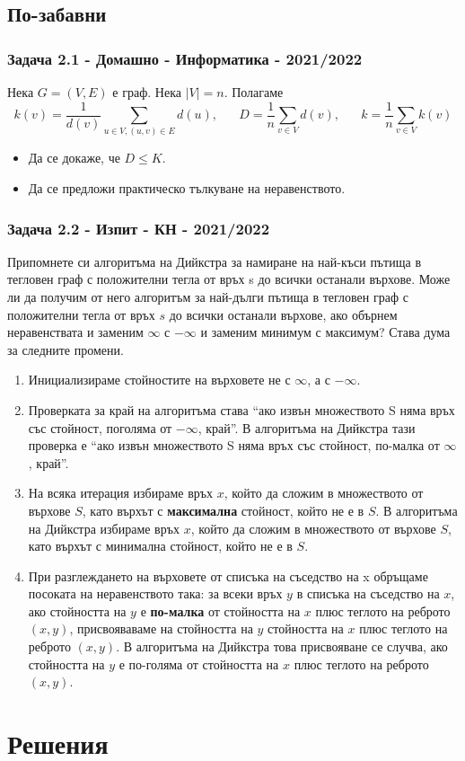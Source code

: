 \documentclass[12pt]{article}
\begin{document}
\subsection*{По-забавни}
\subsubsection*{Задача 2.1 - Домашно - Информатика - 2021/2022}
Нека $G = (V, E)$ е граф. Нека $|V| = n$. Полагаме
\begin{equation*}
    k(v) = \frac{1}{d(v)} \displaystyle\sum_{u \in V, (u, v) \in E} d(u), \; \; \; \; \; \; D = \frac{1}{n}\displaystyle\sum_{v \in V} d(v), \; \; \; \; \; \; k = \frac{1}{n}\displaystyle\sum_{v \in V} k(v) 
\end{equation*}
\begin{itemize}
    \item Да се докаже, че $D \leq K$.
    \item Да се предложи практическо тълкуване на неравенството.
\end{itemize}

\subsubsection*{Задача 2.2 - Изпит - КН - 2021/2022}
Припомнете си алгоритъма на Дийкстра за намиране на най-къси пътища в тегловен граф с положителни тегла от връх s до всички останали върхове. Може ли да получим от него алгоритъм за най-дълги пътища в тегловен граф с положителни тегла от връх $s$ до всички останали върхове, ако обърнем неравенствата и заменим $\infty$ с $-\infty$ и заменим минимум с максимум? Става дума за следните промени.
\begin{enumerate}
    \item Инициализираме стойностите на върховете не с $\infty$, а с $-\infty$.
    \item Проверката за край на алгоритъма става ``ако извън множеството S няма връх със стойност, поголяма от $-\infty$, край''. В алгоритъма на Дийкстра тази проверка е ``ако извън множеството S няма връх със стойност, по-малка от $\infty$, край''.
    \item На всяка итерация избираме връх $x$, който да сложим в множеството от върхове $S$, като върхът с \textbf{максимална} стойност, който не е в $S$. В алгоритъма на Дийкстра избираме връх $x$, който да сложим в множеството от върхове $S$, като върхът с минимална стойност, който не е в $S$.
    \item При разглеждането на върховете от списъка на съседство на x обръщаме посоката на неравенството така: за всеки връх $y$ в списъка на съседство на $x$, ако стойността на $y$ е \textbf{по-малка} от стойността на $x$ плюс теглото на реброто $(x, y)$, присвояваваме на стойността на $y$ стойността на $x$ плюс теглото на реброто $(x, y)$. В алгоритъма на Дийкстра това присвояване се случва, ако стойността на $y$ е по-голяма от стойността на $x$ плюс теглото на реброто $(x, y)$.
\end{enumerate}

\section*{Решения}
\end{document}
